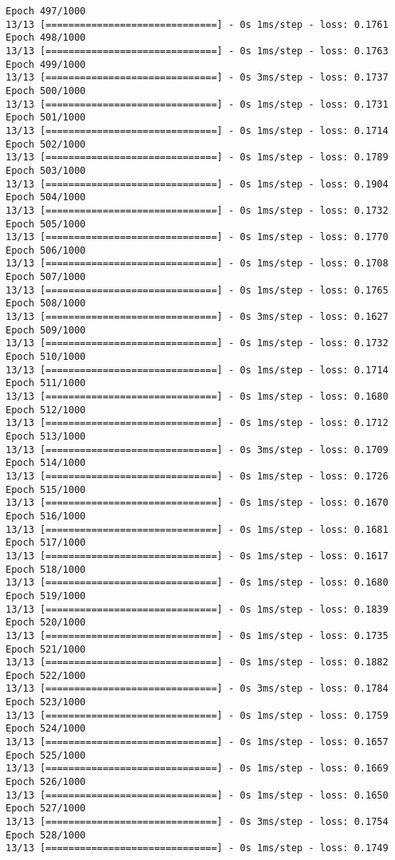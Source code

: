 \documentclass[11pt]{article}
\begin{document}
\begin{Verbatim}[commandchars=\\\{\}]
Epoch 497/1000
13/13 [==============================] - 0s 1ms/step - loss: 0.1761
Epoch 498/1000
13/13 [==============================] - 0s 1ms/step - loss: 0.1763
Epoch 499/1000
13/13 [==============================] - 0s 3ms/step - loss: 0.1737
Epoch 500/1000
13/13 [==============================] - 0s 1ms/step - loss: 0.1731
Epoch 501/1000
13/13 [==============================] - 0s 1ms/step - loss: 0.1714
Epoch 502/1000
13/13 [==============================] - 0s 1ms/step - loss: 0.1789
Epoch 503/1000
13/13 [==============================] - 0s 1ms/step - loss: 0.1904
Epoch 504/1000
13/13 [==============================] - 0s 1ms/step - loss: 0.1732
Epoch 505/1000
13/13 [==============================] - 0s 1ms/step - loss: 0.1770
Epoch 506/1000
13/13 [==============================] - 0s 1ms/step - loss: 0.1708
Epoch 507/1000
13/13 [==============================] - 0s 1ms/step - loss: 0.1765
Epoch 508/1000
13/13 [==============================] - 0s 3ms/step - loss: 0.1627
Epoch 509/1000
13/13 [==============================] - 0s 1ms/step - loss: 0.1732
Epoch 510/1000
13/13 [==============================] - 0s 1ms/step - loss: 0.1714
Epoch 511/1000
13/13 [==============================] - 0s 1ms/step - loss: 0.1680
Epoch 512/1000
13/13 [==============================] - 0s 1ms/step - loss: 0.1712
Epoch 513/1000
13/13 [==============================] - 0s 3ms/step - loss: 0.1709
Epoch 514/1000
13/13 [==============================] - 0s 1ms/step - loss: 0.1726
Epoch 515/1000
13/13 [==============================] - 0s 1ms/step - loss: 0.1670
Epoch 516/1000
13/13 [==============================] - 0s 1ms/step - loss: 0.1681
Epoch 517/1000
13/13 [==============================] - 0s 1ms/step - loss: 0.1617
Epoch 518/1000
13/13 [==============================] - 0s 1ms/step - loss: 0.1680
Epoch 519/1000
13/13 [==============================] - 0s 1ms/step - loss: 0.1839
Epoch 520/1000
13/13 [==============================] - 0s 1ms/step - loss: 0.1735
Epoch 521/1000
13/13 [==============================] - 0s 1ms/step - loss: 0.1882
Epoch 522/1000
13/13 [==============================] - 0s 3ms/step - loss: 0.1784
Epoch 523/1000
13/13 [==============================] - 0s 1ms/step - loss: 0.1759
Epoch 524/1000
13/13 [==============================] - 0s 1ms/step - loss: 0.1657
Epoch 525/1000
13/13 [==============================] - 0s 1ms/step - loss: 0.1669
Epoch 526/1000
13/13 [==============================] - 0s 1ms/step - loss: 0.1650
Epoch 527/1000
13/13 [==============================] - 0s 3ms/step - loss: 0.1754
Epoch 528/1000
13/13 [==============================] - 0s 1ms/step - loss: 0.1749

\end{Verbatim}
\end{document}
